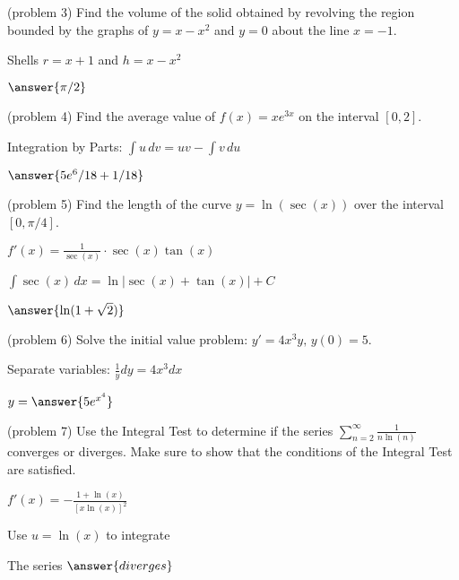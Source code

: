 \documentclass[handout]{ximera}
\begin{document}
\begin{problem}(problem 3)
Find the volume of the solid obtained by revolving the region bounded by the 
graphs of $y = x-x^2$ and $y = 0$ about the line $x = -1$.\\
\begin{hint}
Shells $r = x+1$ and $h = x-x^2$
\end{hint}
$\answer{\pi/2}$
\end{problem}


\begin{problem}(problem 4)
Find the average value of $f(x) = xe^{3x}$ on the interval $[0, 2]$.\\
\begin{hint}
Integration by Parts: $\int u \, dv = uv - \int v \, du$
\end{hint}
$\answer{5e^6/18  + 1/18}$
\end{problem}


\begin{problem}(problem 5)
Find the length of the curve $\displaystyle y = \ln(\sec(x))$ over the interval $[0, \pi/4]$.\\
\begin{hint}
$f'(x) = \frac{1}{\sec(x)} \cdot \sec(x)\tan(x)$
\end{hint}
\begin{hint}
$\int \sec(x) \, dx = \ln|\sec(x) + \tan(x)| + C$
\end{hint}
$\answer{\ln(1 + \sqrt{2})}$
\end{problem}


\begin{problem}(problem 6)
Solve the initial value problem: $\displaystyle y' = 4x^3 y,\, y(0) = 5$.\\
\begin{hint}
Separate variables: $\frac{1}{y} dy = 4x^3 dx$
\end{hint}
$y = \answer{5e^{x^4}}$
\end{problem}


\begin{problem}(problem 7)
Use the Integral Test to determine if the series $\displaystyle \sum_{n=2}^\infty \frac{1}{n\ln(n)}$
converges or diverges. Make sure to show that the
conditions of the Integral Test are satisfied.\\
\begin{hint}
$f'(x) = -\frac{1+\ln(x)}{[x \ln(x)]^2}$
\end{hint}
\begin{hint}
Use $u = \ln(x)$ to integrate
\end{hint}
The series $\answer{diverges}$
\end{problem}
\end{document}
